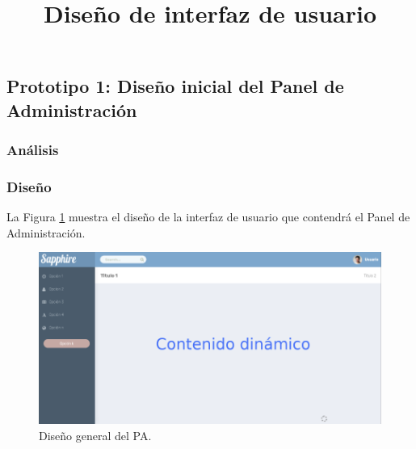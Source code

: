\subsection{Prototipo 1: Diseño inicial del Panel de Administración}

\subsubsection{Análisis}


\subsubsection{Diseño}

\title{\textbf{Diseño de interfaz de usuario \\}}
La Figura \ref{image:disenogeneralPA} muestra el diseño de la interfaz de usuario que contendrá el Panel de Administración.
\FloatBarrier
\begin{figure}[htbp!]
		\centering
			\includegraphics[width=.8 \textwidth]{imagenes/UI/middlewareP1}
		\caption{Diseño general del PA.}
		\label{image:disenogeneralPA}
\end{figure}
\FloatBarrier

